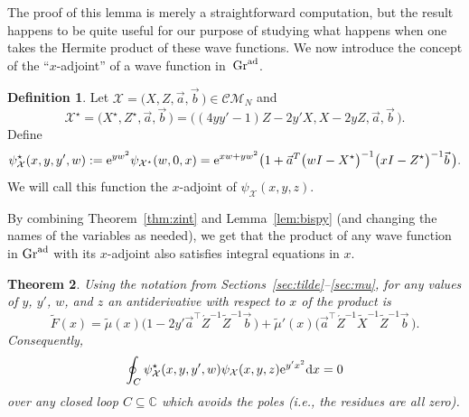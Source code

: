 \documentclass[pdftex]{sigma}
\numberwithin{equation}{section}
\newtheorem{Theorem}{Theorem}[section]
\theoremstyle{definition}
\newtheorem{Definition}[Theorem]{Definition}
\def\psistar{\psi^{\star}}
\def\X{\mathcal{X}}
\def\CM{\mathcal{C\!M}}
\def\C{\mathbb{C}}
\begin{document}
The proof of this lemma is merely a straightforward computation, but
 the result happens to be quite useful for our purpose of studying what
 happens when one takes the Hermite product of these wave functions.
 We now introduce the concept of the ``$x$-adjoint'' of a wave function
 in~${\rm Gr}^{\rm ad}$.

\begin{Definition}\label{def:star}
Let $\X=\bigl(X,Z,\vec a,\vec b\,\bigr)\in\CM_N$
and \[\X^{\star}=\bigl(X^\star,Z^{\star},\vec a,\vec b\,\bigr)=
\bigl((4yy'-1)Z-2y'X,X-2yZ,\vec a,\vec b\,\bigr).
\]
Define
\[
\psistar_{\X}(x,y,y',w):={\rm e}^{yw^2}\psi_{\X^{\star}}(w,0,x)={\rm e}^{xw+yw^2}\bigl(1+\vec
a^T\bigl(wI-X^\star\bigr)^{-1}\bigl(xI-Z^\star\bigr)^{-1}\vec b\,\bigr).
\]
We will call this function the $x$-adjoint of $\psi_{\X}(x,y,z)$.
\end{Definition}

By combining Theorem~\ref{thm:zint} and Lemma~\ref{lem:bispy} (and
changing the names of the variables as needed), we get that the
product of any wave
function in ${\rm Gr}^{\rm ad}$ with its $x$-adjoint also satisfies integral equations in $x$.

\begin{Theorem}\label{thm:xint}
Using the notation from Sections~{\rm\ref{sec:tilde}}--{\rm\ref{sec:mu}}, for any values of $y$, $y'$, $w$, and $z$ an antiderivative with
respect to $x$ of the product
\smash{$
\psistar_{\X}(x,y,y',w)\psi_{\X}(x,y,z){\rm e}^{y'x^2}
$}
is
\begin{equation}\label{eqn:ADinx}
\tilde F(x)=\tilde\mu(x)\bigl(1-2y'\vec a^{\top}\acute Z^{-1}\tilde Z^{-1}\vec
b\,\bigr)+\tilde\mu'(x)\bigl(\vec a^{\top}\acute Z^{-1}
\tilde X^{-1}\tilde Z^{-1}\vec b\,\bigr).
\end{equation}
Consequently,
\[
\oint_C\psistar_{\X}(x,y,y',w) \psi_{\X}(x,y,z){\rm e}^{y'x^2}{\rm d}x=0
\]
over any closed loop $C\subseteq\C$ which avoids the poles {\rm(}i.e., the
residues are all zero{\rm)}.
\end{Theorem}
\end{document}
